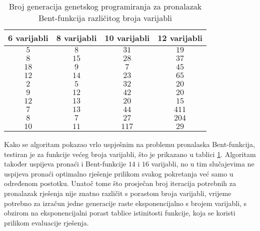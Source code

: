 \begin{table}[]
    \centering
    \begin{tabular}{cccc}
        6 varijabli & 8 varijabli & 10 varijabli & 12 varijabli \\ \hline
         $5$ &  $8$ &  $31$ &  $19$ \\
         $8$ & $15$ &  $28$ &  $37$ \\
        $18$ &  $9$ &   $7$ &  $45$ \\
        $12$ & $14$ &  $23$ &  $65$ \\
         $2$ &  $5$ &  $32$ &  $20$ \\
         $9$ & $12$ &  $42$ &  $20$ \\
        $12$ & $13$ &  $20$ &  $15$ \\
         $7$ & $13$ &  $44$ & $411$ \\
         $8$ &  $7$ &  $27$ & $204$ \\
        $10$ & $11$ & $117$ &  $29$
    \end{tabular}
    \captionsetup{justification=centering}
    \caption{Broj generacija genetskog programiranja za pronalazak Bent-funkcija različitog broja varijabli}
    \label{tbl:gp_bent}
\end{table}
Kako se algoritam pokazao vrlo uspješnim na problemu pronalaska Bent-funkcija, testiran je za funkcije većeg broja varijabli, što je prikazano u tablici \ref{tbl:gp_bent}.
Algoritam također uspijeva pronaći i Bent-funkcije $14$ i $16$ varijabli, no u tim slučajevima ne uspijeva pronaći optimalno rješenje prilikom svakog pokretanja već samo u određenom postotku.
Unatoč tome što prosječan broj iteracija potrebnih za pronalazak rješenja nije znatno različit s porastom broja varijabli, vrijeme potrebno za izračun jedne generacije raste eksponencijalno s brojem varijabli, s obzirom na eksponencijalni porast tablice istinitosti funkcije, koja se koristi prilikom evaluacije rješenja.

